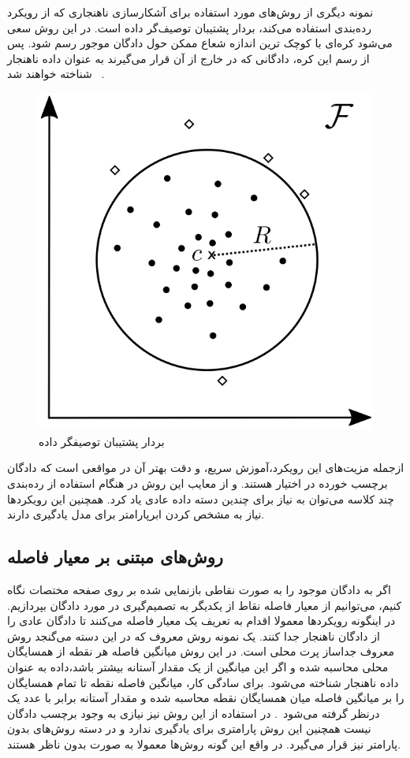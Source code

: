 \documentclass[12pt,a4paper]{report}
\begin{document}
نمونه دیگری از روش‌های مورد استفاده برای آشکارسازی ناهنجاری که از رویکرد رده‌بندی استفاده می‌کند، بردار پشتیبان توصیف‌گر داده‌ است. در این روش سعی می‌شود کره‌ای با کوچک ترین اندازه شعاع ممکن حول دادگان موجور رسم شود. پس از رسم این کره، دادگانی که در خارج از آن قرار می‌گیرند به عنوان داده ناهنجار شناخته خواهند شد~\cite{pmlr-v80-ruff18a} .
\begin{figure}[!h]
	\begin{center}
		\includegraphics[width=0.5\linewidth]{./images/figures/svdd.png}
	\end{center}
	\caption{بردار پشتیبان توصیفگر داده~\cite{pmlr-v80-ruff18a}}
	\label{fig:deep-svdd}
	\centering
\end{figure}

ازجمله مزیت‌های این رویکرد،‌آموزش سریع، و دقت بهتر آن در مواقعی است که دادگان برچسب خورده در اختیار هستند. و از معایب این روش در هنگام استفاده از رده‌بندی چند کلاسه می‌توان به نیاز برای چندین دسته داده عادی یاد کرد. همچنین این رویکرد‌ها نیاز به مشخص کردن ابرپارامتر برای مدل یادگیری دارند.

\subsection{روش‌های مبتنی بر معیار فاصله}
اگر به دادگان موجود را به صورت نقاطی بازنمایی شده بر روی صفحه مختصات نگاه کنیم،‌ می‌توانیم از معیار فاصله نقاط از یکدیگر به تصمیم‌گیری در مورد دادگان بپردازیم. در اینگونه رویکرد‌ها معمولا اقدام به تعریف یک معیار فاصله می‌کنند تا دادگان عادی را از دادگان ناهنجار جدا کنند. یک نمونه روش معروف که در این دسته می‌گنجد روش معروف جداساز پرت محلی است. در این روش میانگین فاصله هر نقطه از همسایگان محلی محاسبه شده و اگر این میانگین از یک مقدار آستانه بیشتر باشد،‌داده به عنوان داده ناهنجار شناخته می‌شود. برای سادگی کار، میانگین فاصله نقطه تا تمام همسایگان را بر میانگین فاصله میان همسایگان نقطه محاسبه شده و مقدار آستانه برابر با عدد یک درنظر گرفته می‌شود~\cite{10.1145/342009.335388}. در استفاده از این روش نیز نیازی به وجود برچسب دادگان نیست همچنین این روش پارامتری برای یادگیری ندارد و در دسته روش‌های بدون پارامتر نیز قرار می‌گیرد. در واقع این گونه روش‌ها معمولا به صورت بدون ناظر هستند.
\end{document}
